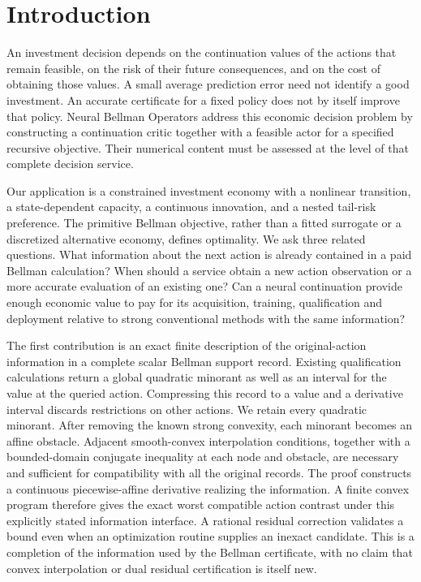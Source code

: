 \section{Introduction}\label{sec:introduction125}

An investment decision depends on the continuation values of the actions
that remain feasible, on the risk of their future consequences, and on the
cost of obtaining those values. A small average prediction error need not
identify a good investment. An accurate certificate for a fixed policy does
not by itself improve that policy. Neural Bellman Operators address this
economic decision problem by constructing a continuation critic together
with a feasible actor for a specified recursive objective. Their numerical
content must be assessed at the level of that complete decision service.

Our application is a constrained investment economy with a nonlinear
transition, a state-dependent capacity, a continuous innovation, and a nested
tail-risk preference. The primitive Bellman objective, rather than a fitted
surrogate or a discretized alternative economy, defines optimality. We ask
three related questions. What information about the next action is already
contained in a paid Bellman calculation? When should a service obtain a new
action observation or a more accurate evaluation of an existing one? Can a
neural continuation provide enough economic value to pay for its acquisition,
training, qualification and deployment relative to strong conventional
methods with the same information?

The first contribution is an exact finite description of the original-action
information in a complete scalar Bellman support record. Existing
qualification calculations return a global quadratic minorant as well as
an interval for the value at the queried action. Compressing this record to
a value and a derivative interval discards restrictions on other actions.
We retain every quadratic minorant. After removing the known strong
convexity, each minorant becomes an affine obstacle. Adjacent smooth-convex
interpolation conditions, together with a bounded-domain conjugate
inequality at each node and obstacle, are necessary and sufficient for
compatibility with all the original records. The proof constructs a
continuous piecewise-affine derivative realizing the information. A finite
convex program therefore gives the exact worst compatible action contrast
under this explicitly stated information interface. A rational residual
correction validates a bound even when an optimization routine supplies an
inexact candidate. This is a completion of the information used by the
Bellman certificate, with no claim that convex interpolation or dual
residual certification is itself new.

